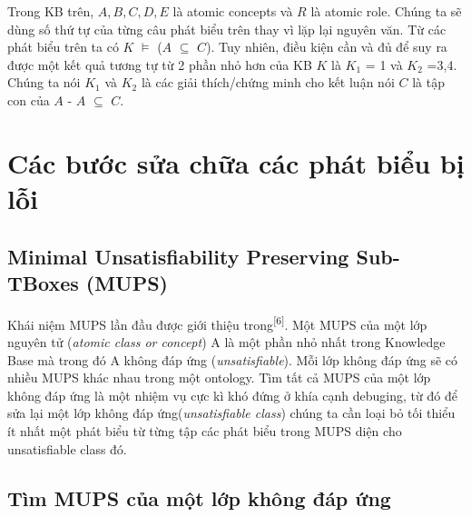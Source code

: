 Trong KB trên, $A, B, C, D, E$ là atomic concepts và $R$ là atomic role.  Chúng ta sẽ dùng số thứ tự của từng câu phát biểu trên thay vì lặp lại nguyên văn.
\hspace*{0.05\textwidth} Từ các phát biểu trên ta có $K$ $\models$ ($A$ $\subseteq$ $C$). Tuy nhiên, điều kiện cần và đủ để suy ra được một kết quả tương tự từ 2 phần nhỏ hơn của KB $K$ là $K_{1}$ = {1} và $K_{2}$ ={3,4}. Chúng ta nói $K_{1}$ và $K_{2}$ là các giải thích/chứng minh cho kết luận nói $C$ là tập con của $A$ - $A$ $\subseteq$ $C$.
\section{Các bước sửa chữa các phát biểu bị lỗi}


\subsection{Minimal Unsatisfiability Preserving Sub-TBoxes (MUPS)}
Khái niệm MUPS lần đầu được giới thiệu trong\textsuperscript{[6]}. Một MUPS của một lớp nguyên tử (\textit{atomic class or concept}) A là một phần nhỏ nhất trong  Knowledge Base mà trong đó A không đáp ứng (\textit{unsatisfiable}). Mỗi lớp không đáp ứng sẽ có nhiều MUPS khác nhau trong một ontology. Tìm tất cả MUPS của một lớp không đáp ứng là một nhiệm vụ cực kì khó đứng ở khía cạnh debuging, từ đó để sửa lại một lớp không đáp ứng(\textit{unsatisfiable class}) chúng ta cần loại bỏ tối thiểu ít nhất một phát biểu từ từng tập các phát biểu trong MUPS diện cho unsatisfiable class đó.
\subsection{Tìm MUPS của một lớp không đáp ứng}
